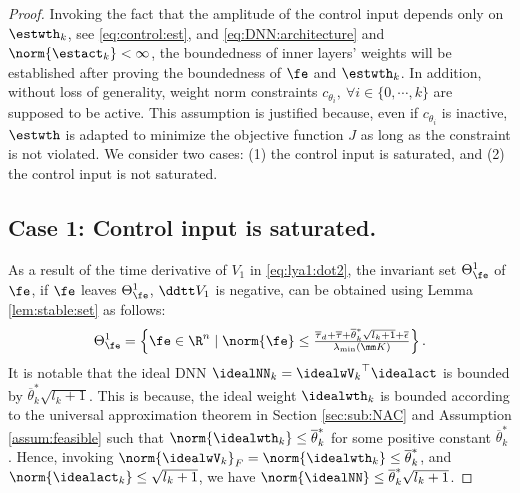 \documentclass[journal]{IEEEtran}
\begin{document}
\begin{proof}

Invoking the fact that the amplitude of the control input depends only on $\estwth_k$, \ie see \eqref{eq:control:est}, and \eqref{eq:DNN:architecture} and $\norm{\estact_k}<\infty$, 
the boundedness of inner layers' weights will be established after proving the boundedness of $\fe$ and $\estwth_k$.
In addition, without loss of generality, weight norm constraints $c_{\theta_i},\ \forall i\in\{0,\cdots,k\}$ are supposed to be active.
This assumption is justified because, even if $c_{\theta_i}$ is inactive, $\estwth$ is adapted to minimize the objective function $J$ as long as the constraint is not violated.
We consider two cases: (1) the control input is saturated, and (2) the control input is not saturated.

\subsection*{Case 1: Control input is saturated.}

As a result of the time derivative of $V_1$ in \eqref{eq:lya1:dot2}, the invariant set $\Theta_{\fe}^{1}$ of $\fe$, \ie if $\fe$ leaves $\Theta_{\fe}^{1}$, $\ddtt V_1$ is negative, can be obtained using Lemma \ref{lem:stable:set} as follows:
\begin{equation}
    \Theta_{\fe}^{1} 
    = 
    \left\{ 
        \fe \in \R^n 
        \mid 
        \norm{\fe} 
        \le 
        \tfrac{
            \overline\tau_d
            +
            \overline\tau
            +
            \overline{\theta}_k^*\sqrt{l_{k}+1}
            +
            \overline{\epsilon}
        }{
            \lambda_{\min}(\mm K)
        }
    \right\}
    .
    \label{eq:invariant:c1:fe}
\end{equation}
It is notable that the ideal DNN $\idealNN_k={\idealwV_k}^\top\idealact$ is bounded by $\overline{\theta}_k^*\sqrt{l_{k}+1}$.
This is because, the ideal weight $\idealwth_k$ is bounded according to the universal approximation theorem in Section \ref{sec:sub:NAC} and Assumption \ref{assum:feasible} such that $\norm{\idealwth_k}\le\overline{\theta}_k^*$ for some positive constant $\overline{\theta}_k^*$.
Hence, invoking $\norm{\idealwV_k}_F = \norm{\idealwth_k} \le \overline{\theta}_k^*$, and $\norm{\idealact_k}\le \sqrt{l_{k}+1}$, we have $\norm{\idealNN}\le \overline{\theta}_k^*\sqrt{l_{k}+1}$.


\end{proof}
\end{document}
